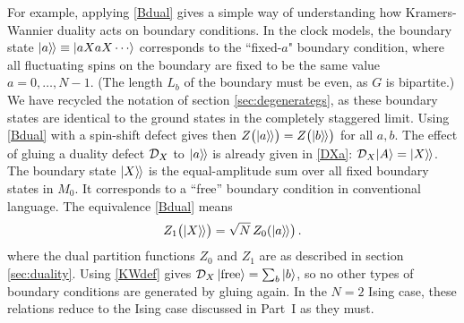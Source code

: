 For example, applying  \eqref{Bdual} gives a simple way of understanding how Kramers-Wannier duality acts on boundary conditions.
In the clock models, the boundary state ${|{a}\rangle\mkern-2mu\rangle} \equiv \ket{aXaX\cdots}$ corresponds to the ``fixed-$a$" boundary condition, where all fluctuating spins on the boundary are fixed to be the same value $a=0,\dots,N-1$. (The length $L_b$ of the boundary must be even, as $G$ is bipartite.)
We have recycled the notation of section \ref{sec:degenerategs}, as these boundary states are identical to the ground states in the completely staggered limit. 
Using \eqref{Bdual} with a spin-shift defect gives then $Z\big({|{a}\rangle\mkern-2mu\rangle}\big) = Z\big({|{b}\rangle\mkern-2mu\rangle}\big)$ for all $a,b$.
The effect of gluing a duality defect $\mathcal{D}_X$ to ${|{a}\rangle\mkern-2mu\rangle}$ is already given in \eqref{DXa}:  $\mathcal{D}_X |A\rangle = {|{X}\rangle\mkern-2mu\rangle}$.
The boundary state ${|{X}\rangle\mkern-2mu\rangle}$ is the equal-amplitude sum over all fixed boundary states in $M_0$.
It corresponds to a ``free'' boundary condition in conventional language. The equivalence \eqref{Bdual} means
\begin{align}
	{Z}_1\big({|{X}\rangle\mkern-2mu\rangle}\big) = \sqrt{N}\, Z_0({|{a}\rangle\mkern-2mu\rangle}\big) \,.
	\label{Zfreefixed}
\end{align}
where the dual partition functions $Z_0$ and $Z_1$ are as described in section \ref{sec:duality}. Using  \eqref{KWdef} gives 
$\mathcal{D}_{X}\ket{{\rm free}} = \sum_{b}\ket{b}$, so no other types of boundary conditions are generated by gluing again.
In the $N=2$ Ising case, these relations reduce to the Ising case discussed in Part~I as they must. 

